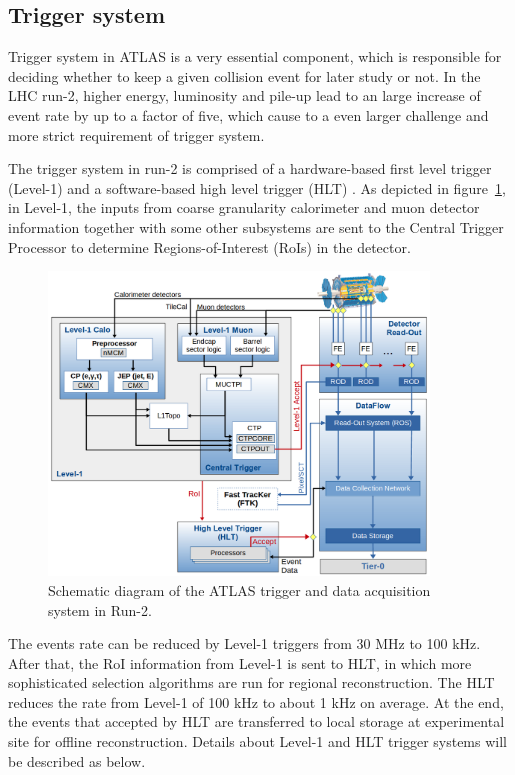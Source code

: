\subsection{Trigger system}

Trigger system in ATLAS is a very essential component, which is responsible for deciding whether to keep a given collision event for later study or not.
In the LHC run-2, higher energy, luminosity and pile-up lead to an large increase of event rate by up to a factor of five, which cause to a even larger challenge and more strict requirement of trigger system.

The trigger system in run-2 is comprised of a hardware-based first level trigger (Level-1) and a software-based high level trigger (HLT) \cite{Ruiz-Martinez:2133909}.
As depicted in figure~\ref{fig:trig_syst}, in Level-1, the inputs from coarse granularity calorimeter and muon detector information together with some other subsystems are sent to the Central Trigger Processor to determine Regions-of-Interest (RoIs) in the detector. 
\begin{figure}[!htb]
  \centering
  \includegraphics[width=0.9\textwidth]{figures/Detector/tdaq-run2-schematic2017.png}
  \caption{Schematic diagram of the ATLAS trigger and data acquisition system in Run-2.}
  \label{fig:trig_syst}
\end{figure}
The events rate can be reduced by Level-1 triggers from 30 MHz to 100 kHz. 
After that, the RoI information from Level-1 is sent to HLT, in which more sophisticated selection algorithms are run for regional reconstruction.
The HLT reduces the rate from Level-1 of 100 kHz to about 1 kHz on average.
At the end, the events that accepted by HLT are transferred to local storage at experimental site for offline reconstruction.
Details about Level-1 and HLT trigger systems will be described as below.

